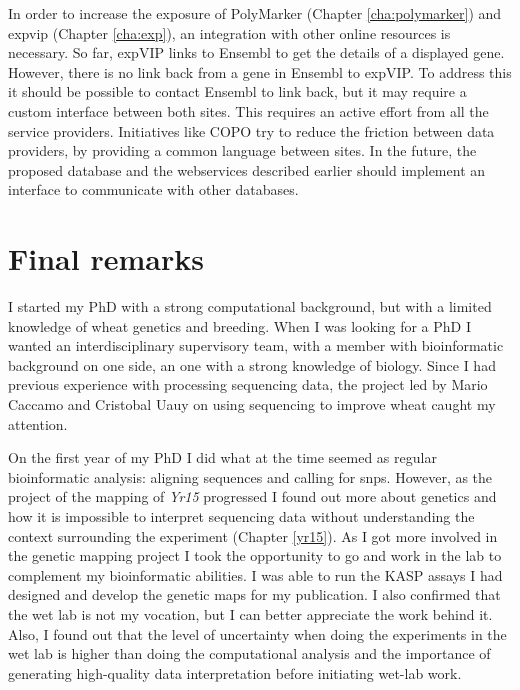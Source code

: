 In order to increase the exposure of PolyMarker (Chapter \ref{cha:polymarker}) and \gls{expvip} (Chapter \ref{cha:exp}), an integration with other online resources is necessary. 
So far, expVIP links to Ensembl to get the details of a displayed gene. 
However, there is no link back from a gene in Ensembl to expVIP. 
To address this it should be possible to contact Ensembl to link back, but it may require a custom interface between both sites. 
This requires an active effort from all the service providers. 
Initiatives like COPO try to reduce the friction between data providers, by providing a common language between sites. 
In the future, the proposed database and the webservices described earlier should implement an interface to communicate with other databases. 

\section{Final remarks}

I started my PhD with a strong computational background, but with a limited knowledge of wheat genetics and breeding.
When I was looking for a PhD I wanted an interdisciplinary supervisory team, with a member with bioinformatic background on one side, an one with a strong knowledge of biology. 
Since I had previous experience with processing sequencing data, the project led by Mario Caccamo and Cristobal Uauy on using sequencing to improve wheat caught my attention.

On the first year of my PhD I did what at the time seemed as regular bioinformatic analysis: aligning sequences and calling for \glspl{snp}. 
However, as the project of the mapping of \textit{Yr15} progressed I found out more about genetics and how it is impossible to interpret sequencing data without understanding the context surrounding the experiment (Chapter \ref{yr15}). 
As I got more involved in the genetic mapping project I took the opportunity to go and work in the lab to complement my bioinformatic abilities. 
I was able to run the KASP assays I had designed and develop the genetic maps for my publication. 
I also confirmed that the wet lab is not my vocation, but I can better appreciate the work behind it. 
Also, I found out that the level of uncertainty when doing the experiments in the wet lab is higher than doing the computational analysis and the importance of generating high-quality data interpretation before initiating wet-lab work.

